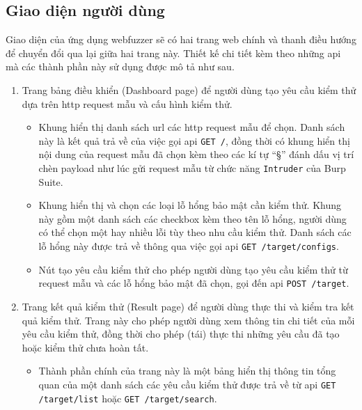 \subsection{Giao diện người dùng}
Giao diện của ứng dụng webfuzzer sẽ có hai trang web chính và thanh điều hướng để chuyển đổi qua lại giữa hai trang này. Thiết kế chi tiết kèm theo những \acrshort{api} mà các thành phần này sử dụng được mô tả như sau.
\begin{enumerate}
    \item Trang bảng điều khiển (Dashboard page) để người dùng tạo yêu cầu kiểm thử dựa trên \acrshort{http} request mẫu và cấu hình kiểm thử.
    \begin{itemize}
        \item Khung hiển thị danh sách \acrshort{url} các \acrshort{http} request mẫu để chọn. Danh sách này là kết quả trả về của việc gọi \acrshort{api} \colorbox{gray!30}{\texttt{GET /}}, đồng thời có khung hiển thị nội dung của request mẫu đã chọn kèm theo các kí tự ``\S'' đánh dấu vị trí chèn payload như lúc gửi request mẫu từ chức năng \texttt{Intruder} của Burp Suite.
        \item Khung hiển thị và chọn các loại lỗ hổng bảo mật cần kiểm thử. Khung này gồm một danh sách các checkbox kèm theo tên lỗ hổng, người dùng có thể chọn một hay nhiều lỗi tùy theo nhu cầu kiểm thử. Danh sách các lỗ hổng này được trả về thông qua việc gọi \acrshort{api} \colorbox{gray!30}{\texttt{GET /target/configs}}.
        \item Nút tạo yêu cầu kiểm thử cho phép người dùng tạo yêu cầu kiểm thử từ request mẫu và các lỗ hổng bảo mật đã chọn, gọi đến \acrshort{api} \colorbox{gray!30}{\texttt{POST /target}}.
    \end{itemize}
    \item Trang kết quả kiểm thử (Result page) để người dùng thực thi và kiểm tra kết quả kiểm thử. Trang này cho phép người dùng xem thông tin chi tiết của mỗi yêu cầu kiểm thử, đồng thời cho phép (tái) thực thi những yêu cầu đã tạo hoặc kiểm thử chưa hoàn tất.
    \begin{itemize}
        \item Thành phần chính của trang này là một bảng hiển thị thông tin tổng quan của một danh sách các yêu cầu kiểm thử được trả về từ \acrshort{api} \colorbox{gray!30}{\texttt{GET /target/list}} hoặc \colorbox{gray!30}{\texttt{GET /target/search}}.

\end{itemize}
\end{enumerate}
